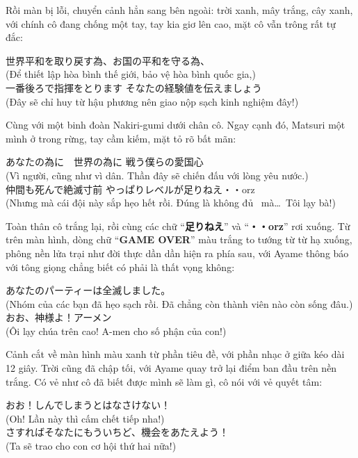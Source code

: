 \documentclass[../main.tex]{subfiles}
\begin{document}

Rồi màn bị lỗi, chuyển cảnh hẳn sang bên ngoài: trời xanh, mây trắng, cây xanh, với chính cô đang chống một tay, tay kia giơ lên cao, mặt cô vẫn trông rất tự đắc:
\begin{center}
  世界平和を取り戻す為、お国の平和を守る為、 \\ (Để thiết lập hòa bình thế giới, bảo vệ hòa bình quốc gia,) \\
  一番後ろで指揮をとります  そなたの経験値を伝えましょう \\ (Đây sẽ chỉ huy từ hậu phương nên giao nộp sạch kinh nghiệm đây!)
\end{center}


Cùng với một binh đoàn Nakiri-gumi dưới chân cô. Ngay cạnh đó, Matsuri một mình ở trong rừng, tay cầm kiếm, mặt tỏ rõ bất mãn:
\begin{center}
  あなたの為に　世界の為に   戦う僕らの愛国心 \\ (Vì người, cũng như vì dân. Thần đây sẽ chiến đấu với lòng yêu nước.) \\
  仲間も死んで絶滅寸前   やっぱりレベルが足りねえ・・orz \\ (Nhưng mà cái đội này sắp hẹo hết rồi. Đúng là không đủ \ mà\dots\ Tôi lạy bà!)
\end{center}

Toàn thân cô trắng lại, rồi cùng các chữ ``\textbf{足りねえ}'' và ``\textbf{・・orz}'' rơi xuống. Từ trên màn hình, dòng chữ ``\textbf{GAME OVER}'' màu trắng to tướng từ từ hạ xuống, phông nền lửa trại như đời thực dần dần hiện ra phía sau, với Ayame thông báo với tông giọng chẳng biết có phải là thất vọng không:
\begin{center}
  あなたのパーティーは全滅しました。 \\ (Nhóm của các bạn đã hẹo sạch rồi. Đã chẳng còn thành viên nào còn sống đâu.) \\
  おお、神様よ！アーメン \\ (Ôi lạy chúa trên cao! A-men cho số phận của con!)
\end{center}

Cảnh cắt về màn hình màu xanh từ phần tiêu đề, với phần nhạc ở giữa kéo dài 12 giây. Trời cũng đã chập tối, với Ayame quay trở lại điểm ban đầu trên nền trắng. Có vẻ như cô đã biết được mình sẽ làm gì, cô nói với vẻ quyết tâm:
\begin{center}
  おお！しんでしまうとはなさけない！ \\ (Oh! Lần này thì cấm chết tiếp nha!) \\
  さすればそなたにもういちど、機会をあたえよう！ \\ (Ta sẽ trao cho con cơ hội thứ hai nữa!)
\end{center}
\end{document}
